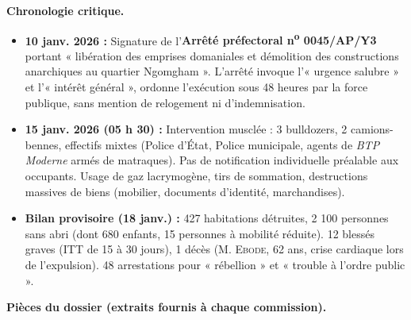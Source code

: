 \documentclass[11pt]{article}
\begin{document}
\textbf{Chronologie critique.}
\begin{itemize}
    \item \textbf{10 janv. 2026 :} Signature de l'\textbf{Arrêté préfectoral n\textsuperscript{o} 0045/AP/Y3} portant « libération des emprises domaniales et démolition des constructions anarchiques au quartier Ngomgham ». L'arrêté invoque l'« urgence salubre » et l'« intérêt général », ordonne l'exécution sous 48 heures par la force publique, sans mention de relogement ni d'indemnisation.
    \item \textbf{15 janv. 2026 (05 h 30) :} Intervention musclée : 3 bulldozers, 2 camions-bennes, effectifs mixtes (Police d'État, Police municipale, agents de \emph{BTP Moderne} armés de matraques). Pas de notification individuelle préalable aux occupants. Usage de gaz lacrymogène, tirs de sommation, destructions massives de biens (mobilier, documents d'identité, marchandises).
    \item \textbf{Bilan provisoire (18 janv.) :} 427 habitations détruites, 2 100 personnes sans abri (dont 680 enfants, 15 personnes à mobilité réduite). 12 blessés graves (ITT de 15 à 30 jours), 1 décès (M. \textsc{Ebode}, 62 ans, crise cardiaque lors de l'expulsion). 48 arrestations pour « rébellion » et « trouble à l'ordre public ».
\end{itemize}

\textbf{Pièces du dossier (extraits fournis à chaque commission).}
\end{document}
